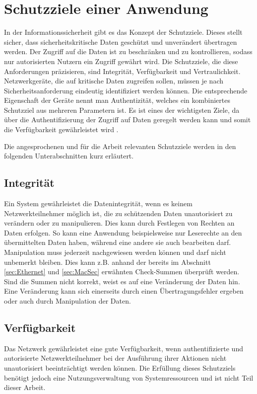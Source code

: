 \section{Schutzziele einer Anwendung}\label{sec:Schutzziele}
In der Informationssicherheit gibt es das Konzept der Schutzziele. Dieses stellt sicher, dass sicherheitskritische Daten geschützt und unverändert übertragen werden. Der Zugriff auf die Daten ist zu beschränken und zu kontrollieren, sodass nur autorisierten Nutzern ein Zugriff gewährt wird. Die Schutzziele, die diese Anforderungen präzisieren, sind Integrität, Verfügbarkeit und Vertraulichkeit. Netzwerkgeräte, die auf kritische Daten zugreifen sollen, müssen je nach Sicherheitsanforderung eindeutig identifiziert werden können. Die entsprechende Eigenschaft der Geräte nennt man Authentizität, welches ein kombiniertes Schutzziel aus mehreren Parametern ist. Es ist eines der wichtigsten Ziele, da über die Authentifizierung der Zugriff auf Daten geregelt werden kann und somit die Verfügbarkeit gewährleistet wird \cite{Schutzziel}.

Die angesprochenen und für die Arbeit relevanten Schutzziele werden in den folgenden Unterabschnitten kurz erläutert.

\newpage

\subsection{Integrität}
Ein System gewährleistet die Datenintegrität, wenn es keinem Netzwerkteilnehmer möglich ist, die zu schützenden Daten unautorisiert zu verändern oder zu manipulieren.
Dies kann durch Festlegen von Rechten an Daten erfolgen. So kann eine Anwendung beispielsweise nur Leserechte an den übermittelten Daten haben, während eine andere sie auch bearbeiten darf.
Manipulation muss jederzeit nachgewiesen werden können und darf nicht unbemerkt bleiben. Dies kann z.B. anhand der bereits im Abschnitt \ref{sec:Ethernet} und \ref{sec:MacSec} erwähnten Check-Summen überprüft werden. Sind die Summen nicht korrekt, weist es auf eine Veränderung der Daten hin. Eine Veränderung kann sich einerseits durch einen Übertragungsfehler ergeben oder auch durch Manipulation der Daten.

\subsection{Verfügbarkeit}
Das Netzwerk gewährleistet eine gute Verfügbarkeit, wenn authentifizierte und autorisierte Netzwerkteilnehmer bei der Ausführung ihrer Aktionen nicht unautorisiert beeinträchtigt werden können. Die Erfüllung dieses Schutzziels benötigt jedoch eine Nutzungsverwaltung von Systemressourcen und ist nicht Teil dieser Arbeit.

